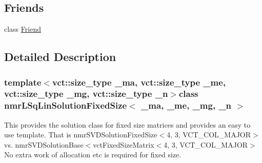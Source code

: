 \subsection*{Friends}
\begin{DoxyCompactItemize}
\item 
class \hyperlink{classnmr_l_sq_lin_solution_fixed_size_a7f8321d57e81bc613d5dbef3410ba70e}{Friend}
\end{DoxyCompactItemize}


\subsection{Detailed Description}
\subsubsection*{template$<$vct\-::size\-\_\-type \-\_\-ma, vct\-::size\-\_\-type \-\_\-me, vct\-::size\-\_\-type \-\_\-mg, vct\-::size\-\_\-type \-\_\-n$>$class nmr\-L\-Sq\-Lin\-Solution\-Fixed\-Size$<$ \-\_\-ma, \-\_\-me, \-\_\-mg, \-\_\-n $>$}

This provides the solution class for fixed size matrices and provides an easy to use template. That is nmr\-S\-V\-D\-Solution\-Fixed\-Size$<$4, 3, V\-C\-T\-\_\-\-C\-O\-L\-\_\-\-M\-A\-J\-O\-R$>$ vs. nmr\-S\-V\-D\-Solution\-Base$<$vct\-Fixed\-Size\-Matrix$<$4, 3, V\-C\-T\-\_\-\-C\-O\-L\-\_\-\-M\-A\-J\-O\-R$>$ No extra work of allocation etc is required for fixed size. 

